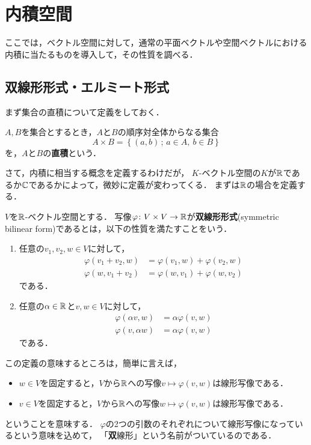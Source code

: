 \section{内積空間}
ここでは，ベクトル空間に対して，通常の平面ベクトルや空間ベクトルにおける内積に当たるものを導入して，その性質を調べる．
\subsection{双線形形式・エルミート形式}
まず集合の直積について定義をしておく．
\begin{dfn}
$A,B$を集合とするとき，$A$と$B$の順序対全体からなる集合
\[
  A \times B = \left\{ (a,b) \,;\, a \in A,\ b \in B \right\} 
\]
を，$A$と$B$の\textbf{直積}という．
\end{dfn}
さて，内積に相当する概念を定義するわけだが，
$K$-ベクトル空間の$K$が$\mathbb{R}$であるか$\mathbb{C}$であるかによって，微妙に定義が変わってくる．
まずは$\mathbb{R}$の場合を定義する．
\begin{dfn}\label{dfn:bilinear}
  $V$を$\mathbb{R}$-ベクトル空間とする．
  写像$\varphi\colon V \times V \to \mathbb{R}$が\textbf{双線形形式}(symmetric bilinear form)であるとは，以下の性質を満たすことをいう．
  \begin{enumerate}
    \item 任意の$v_1,v_2,w\in V$に対して，
    \[
      \begin{aligned}
        \varphi(v_1 + v_2, w) &= \varphi(v_1,w) + \varphi (v_2,w) \\
        \varphi(w, v_1 + v_2) &= \varphi(w,v_1) + \varphi (w,v_2)
      \end{aligned}
    \]
    である．
    \item 任意の$\alpha \in \mathbb{R}$と$v,w\in V$に対して，
    \[
      \begin{aligned}
        \varphi(\alpha v, w) &= \alpha \varphi(v,w) \\
        \varphi(v,\alpha w) &= \alpha \varphi(v,w)
      \end{aligned}
    \]
    である．
  \end{enumerate}
\end{dfn}
この定義の意味するところは，簡単に言えば，
\begin{itemize}
  \item $w \in V$を固定すると，$V$から$\mathbb{R}$への写像$v \mapsto \varphi(v,w)$は線形写像である．
  \item $v \in V$を固定すると，$V$から$\mathbb{R}$への写像$w \mapsto \varphi(v,w)$は線形写像である．
\end{itemize}
ということを意味する．
$\varphi$の2つの引数のそれぞれについて線形写像になっているという意味を込めて，
「\textbf{双}線形」という名前がついているのである．

